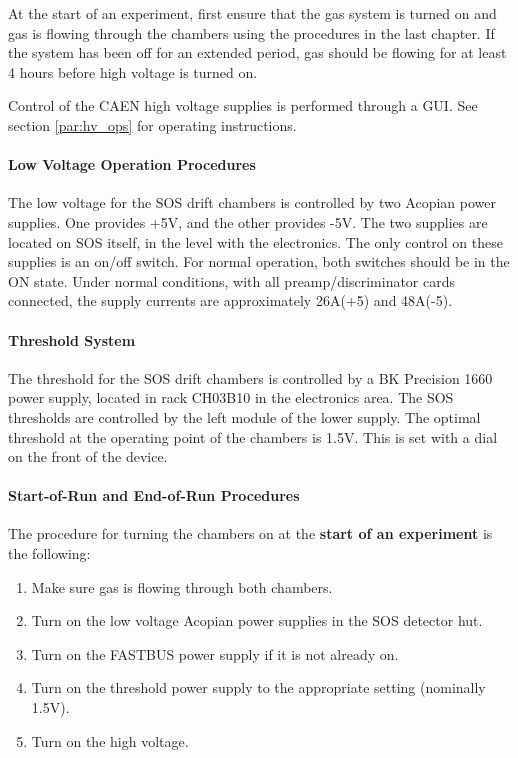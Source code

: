 At the start of an experiment, first ensure that the gas system is
turned on and gas is flowing through the chambers using the procedures
in the last chapter.  If the system has been off for an extended
period, gas should be flowing for at least 4 hours before high
voltage is turned on.

Control of the CAEN high voltage supplies is performed through
a GUI. See section \ref{par:hv_ops} for operating instructions.

\paragraph{Low Voltage Operation Procedures}

The low voltage for the SOS drift chambers is controlled by two
Acopian power supplies.  One provides +5V, and the other provides -5V.
The two supplies are located on SOS itself, in the level with the
electronics.  The only control on these supplies is an on/off
switch.  For normal operation, both switches should be in the ON
state.  Under normal conditions, with all preamp/discriminator cards
connected, the supply currents are approximately 26A(+5) and 48A(-5).

\paragraph{Threshold System}

The threshold for the SOS drift chambers is controlled by a BK
Precision 1660 power supply, located in rack CH03B10 in the
electronics area.  The SOS thresholds are controlled by the left
module of the lower supply.  The optimal threshold at the operating
point of the chambers is 1.5V.  This is set with a dial on the front
of the device.

\paragraph{Start-of-Run and End-of-Run Procedures}

The procedure for turning the chambers on at the {\bf start of an
experiment} is the following:

\begin{enumerate}
\item{Make sure gas is flowing through both chambers.}
\item{Turn on the low voltage Acopian power supplies in the SOS
      detector hut.}
\item{Turn on the FASTBUS power supply if it is not already on.}
\item{Turn on the threshold power supply to the appropriate setting
      (nominally 1.5V).}
\item{Turn on the high voltage.}
\end{enumerate}

